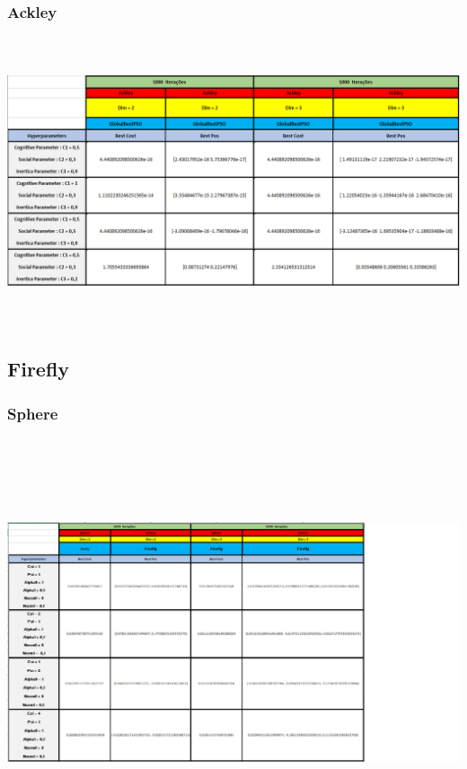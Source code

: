 \documentclass[10pt]{article}
\begin{document}
\subsubsection{Ackley}\label{sec:comp-PSO}
  \includegraphics[height=8.5cm]{img/PSOackley.png}

\subsection{Firefly}\label{sec:comp-PSO}
\subsubsection{Sphere}\label{sec:comp-PSO}
  \includegraphics[height=12cm]{img/Fireflysphere.png}
\end{document}
